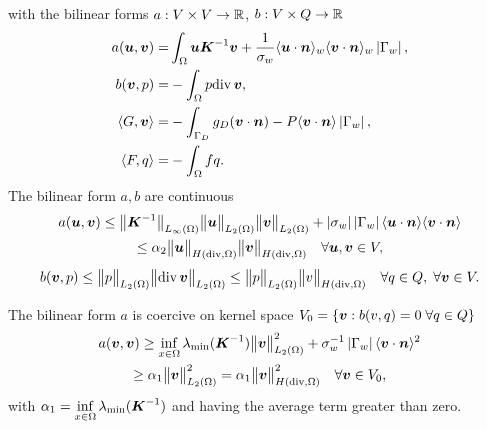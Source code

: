 with the bilinear forms $a: V\times V \rightarrow \mathbb{R}$, $b: V\times Q \rightarrow \mathbb{R}$
\begin{align*}
 a(\vc u, \vc v)=& \int_\Omega \vc u \vc K^{-1} \vc v
                   + \frac{1}{\sigma_w}\avg{\vc u\cdot \vc n}_w \avg{\vc v\cdot \vc n}_w \abs{\Gamma_w},\\
%
 b(\vc v, p)=& - \int_\Omega p \div\, \vc v,\\
%
 \langle G, \vc v\rangle =&
        -\int_{\Gamma_D} g_{D} (\vc v \cdot \vc n) - P\avg{\vc v\cdot\vc n} \abs{\Gamma_w},\\
 \langle F, q\rangle =& - \int_{\Omega} f q.
\end{align*}
The bilinear form $a,b$ are continuous
\begin{multline}
    a(\mathbf{\boldsymbol{u}},\mathbf{\boldsymbol{v}}) \leq \bigl\Vert\mathbf{\boldsymbol{K}}^{-1}\bigr\Vert_{L_\infty(\Omega)} \bigl\Vert\mathbf{\boldsymbol{u}}\bigr\Vert_{L_2(\Omega)} \bigl\Vert\mathbf{\boldsymbol{v}}\bigr\Vert_{L_2(\Omega)}
        + \left|\sigma_w\right| \left|\Gamma_w\right| \langle\mathbf{\boldsymbol{u}}\cdot\mathbf{\boldsymbol{n}}\rangle \langle\mathbf{\boldsymbol{v}}\cdot\mathbf{\boldsymbol{n}}\rangle\\
        \leq \alpha_2 \bigl\Vert\mathbf{\boldsymbol{u}}\bigr\Vert_{H({\rm div},\Omega)} \bigl\Vert\mathbf{\boldsymbol{v}}\bigr\Vert_{H({\rm div},\Omega)} \quad \forall \mathbf{\boldsymbol{u}},\mathbf{\boldsymbol{v}}\in V,
\end{multline}
\begin{multline}
    b(\mathbf{\boldsymbol{v}},p) \leq \bigl\Vert p\bigr\Vert_{L_2(\Omega)} \bigl\Vert{\rm div}\,\mathbf{\boldsymbol{v}}\bigr\Vert_{L_2(\Omega)}
        \leq \bigl\Vert p\bigr\Vert_{L_2(\Omega)} \bigl\Vert v\bigr\Vert_{H({\rm div},\Omega)} \quad \forall q\in Q,\;\forall \mathbf{\boldsymbol{v}}\in V. \\
\end{multline}

The bilinear form $a$ is coercive on kernel space $V_0=\{\mathbf{\boldsymbol{v}}: b(v,q)=0\;\forall q\in Q\}$
\begin{multline}
    a(\mathbf{\boldsymbol{v}},\mathbf{\boldsymbol{v}}) \geq \inf_{x\in\Omega}\lambda_{\min}(\mathbf{\boldsymbol{K}}^{-1}) \bigl\Vert\mathbf{\boldsymbol{v}}\bigr\Vert^2_{L_2(\Omega)}
                + \sigma_w^{-1}\left|\Gamma_w\right|\langle\mathbf{\boldsymbol{v}}\cdot\mathbf{\boldsymbol{n}}\rangle^2 \\
        \geq  \alpha_1 \bigl\Vert\mathbf{\boldsymbol{v}}\bigr\Vert^2_{L_2(\Omega)} = \alpha_1 \bigl\Vert\mathbf{\boldsymbol{v}}\bigr\Vert^2_{H({\rm div},\Omega)} \quad \forall \mathbf{\boldsymbol{v}}\in V_0,
\end{multline}
with $\alpha_1=\inf\limits_{x\in\Omega}\lambda_{\min}(\mathbf{\boldsymbol{K}}^{-1})$ and having the average term greater than zero.

